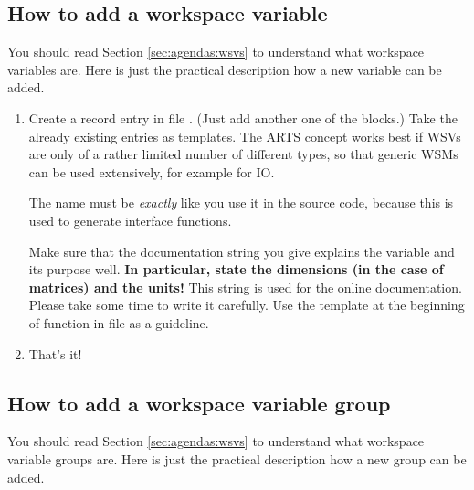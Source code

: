 \subsection{How to add a workspace variable}

You should read Section \ref{sec:agendas:wsvs} to understand what workspace
variables are. Here is just the practical description how a new
variable can be added.

\begin{enumerate}
\item Create a record entry in file . (Just add
  another one of the  blocks.) Take the
  already existing entries as templates. The ARTS concept works best
  if WSVs are only of a rather limited number of different types, so
  that generic WSMs can be used extensively, for example for IO.
      
  The name must be \emph{exactly} like you use it in the source code,
  because this is used to generate interface functions.
  
  Make sure that the documentation string you give explains the
  variable and its purpose well. \textbf{In particular, state the
    dimensions (in the case of matrices) and the units!} This string
  is used for the online documentation. Please take some time to write
  it carefully. Use the template at the beginning of function
   in file  as a
  guideline. 

\item That's it!
\end{enumerate}


\subsection{How to add a workspace variable group}

You should read Section \ref{sec:agendas:wsvs} to understand what workspace
variable groups are. Here is just the practical description how a new
group can be added.

